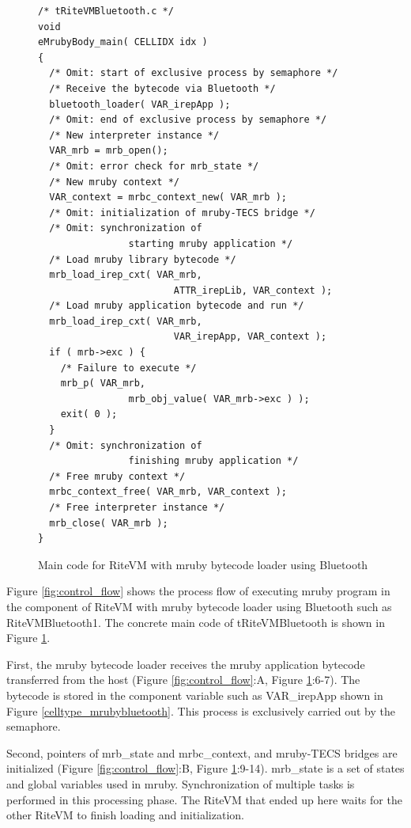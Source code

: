 \documentclass{sig-alternate-05-2015}
\begin{document}
\begin{figure}[t]
\centering
\begin{lstlisting}
/* tRiteVMBluetooth.c */
void
eMrubyBody_main( CELLIDX idx )
{
  /* Omit: start of exclusive process by semaphore */
  /* Receive the bytecode via Bluetooth */
  bluetooth_loader( VAR_irepApp );
  /* Omit: end of exclusive process by semaphore */
  /* New interpreter instance */
  VAR_mrb = mrb_open();
  /* Omit: error check for mrb_state */
  /* New mruby context */
  VAR_context = mrbc_context_new( VAR_mrb );
  /* Omit: initialization of mruby-TECS bridge */
  /* Omit: synchronization of
                starting mruby application */
  /* Load mruby library bytecode */
  mrb_load_irep_cxt( VAR_mrb,
                        ATTR_irepLib, VAR_context );
  /* Load mruby application bytecode and run */
  mrb_load_irep_cxt( VAR_mrb,
                        VAR_irepApp, VAR_context );
  if ( mrb->exc ) {
    /* Failure to execute */
    mrb_p( VAR_mrb, 
                mrb_obj_value( VAR_mrb->exc ) );
    exit( 0 );
  }
  /* Omit: synchronization of
                finishing mruby application */
  /* Free mruby context */
  mrbc_context_free( VAR_mrb, VAR_context );
  /* Free interpreter instance */
  mrb_close( VAR_mrb );
}

\end{lstlisting}
\caption{Main code for RiteVM with mruby bytecode loader using Bluetooth}
\label{maincode_mrubybluetooth}
\end{figure}

Figure \ref{fig:control_flow} shows the process flow of executing mruby program in the component of RiteVM with mruby bytecode loader using Bluetooth such as RiteVMBluetooth1.
The concrete main code of tRiteVMBluetooth is shown in Figure \ref{maincode_mrubybluetooth}.

First, the mruby bytecode loader receives the mruby application bytecode transferred from the host (Figure \ref{fig:control_flow}:A, Figure \ref{maincode_mrubybluetooth}:6-7).
The bytecode is stored in the component variable such as VAR\_irepApp shown in Figure \ref{celltype_mrubybluetooth}.
This process is exclusively carried out by the semaphore.

Second, pointers of {\myit mrb\_state} and {\myit mrbc\_context}, and mruby-TECS bridges are initialized (Figure \ref{fig:control_flow}:B, Figure \ref{maincode_mrubybluetooth}:9-14).
{\myit mrb\_state} is a set of states and global variables used in mruby.
Synchronization of multiple tasks is performed in this processing phase.
The RiteVM that ended up here waits for the other RiteVM to finish loading and initialization.
\end{document}
